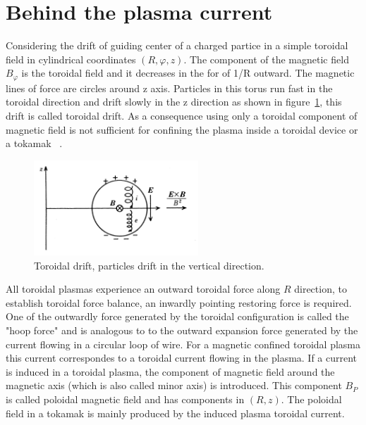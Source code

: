 \section{Behind the plasma current}

Considering the drift of guiding center of a charged partice in a simple toroidal field in cylindrical coordinates $(R,\varphi,z)$. The component of the magnetic field $B_\varphi$ is the toroidal field and it decreases in the for of 1/R outward. The magnetic lines of force are circles around z axis. Particles in this  torus run fast in the toroidal direction and drift slowly in the z direction as shown in figure~\ref{TDrift}, this drift is called toroidal drift. As a consequence  using only a toroidal component of magnetic field is not sufficient for confining the plasma inside a toroidal device or a tokamak ~\cite[Chapter~3]{Miyamoto2011}.\smallskip


\begin{figure}
	\centering
	\includegraphics[width=0.55\textwidth]{Chp1/ToroidalDrift.png}
	\caption{Toroidal drift, particles drift in the vertical direction. ~\cite[Chapter~3]{Miyamoto2011} \label{TDrift}}
\end{figure}



All toroidal plasmas experience an outward toroidal force along $R$ direction, to establish toroidal force balance,  an inwardly pointing restoring force is required. One of the outwardly force generated by the toroidal configuration is called the "hoop force" and is analogous to  to the outward expansion force generated by the current flowing in a circular loop of wire. For a magnetic confined toroidal plasma this current correspondes to a toroidal current flowing in the plasma. If a current is induced in a toroidal plasma, the component of magnetic field around the magnetic axis (which is also called minor axis) is introduced. This component $B_P$ is called poloidal magnetic field and has components in $(R,z)$. \smallskip The poloidal field in a tokamak is mainly produced by the induced plasma toroidal current.  


